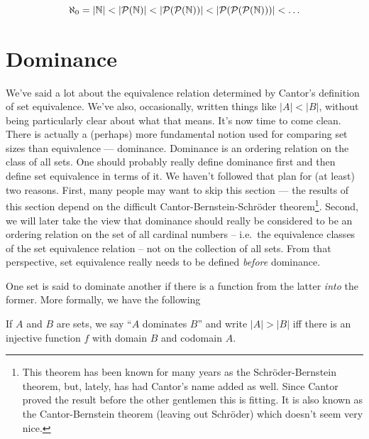 \[ \aleph_0  = |{\mathbb N}| < |{\mathcal P}({\mathbb N})| < |{\mathcal P}({\mathcal P}({\mathbb N}))| < |{\mathcal P}({\mathcal P}({\mathcal P}({\mathbb N})))| < \ldots \]

\clearpage




\newpage

\section{Dominance}
\label{sec:dominance}

We've said a lot about the equivalence relation 
determined by Cantor's definition
of set equivalence.  We've also, occasionally, written things like 
$|A| < |B|$, without being particularly clear about what that means.  
It's now time to come clean.  There is actually a (perhaps) more fundamental 
notion used for comparing set sizes than equivalence --- dominance. 
Dominance is an ordering relation on the class of all sets.  
One should probably really define dominance first and then
define set equivalence in terms of it.  We haven't followed that plan
for (at least) two reasons.   First, many people may want to skip this 
section --- the results of this section depend on the difficult 
Cantor-Bernstein-Schr\"{o}der theorem\footnote{This theorem has been %
known for many years as the Schr\"{o}der-Bernstein theorem, but, %
lately, has had Cantor's name added as well.  Since Cantor proved %
the result before the other gentlemen this is fitting.  It is also %
known as the Cantor-Bernstein theorem (leaving out Schr\"{o}der) %
which doesn't seem very nice.}.  Second, we will later take the view that dominance
should really be considered to be an ordering relation on the set of
all cardinal numbers -- i.e.\ the equivalence classes of the set equivalence
relation -- not on the collection of all sets.  From that perspective,
set equivalence really needs to be defined \emph{before} dominance.

One set is said to dominate another if there is a function from the latter
\emph{into} the former.
More formally, we have the following

\begin{defi}  If $A$ and $B$ are sets, we say ``$A$ dominates $B$'' 
and write $|A| > |B|$ iff there is an injective function $f$ with 
domain $B$ and codomain $A$.
\end{defi}

